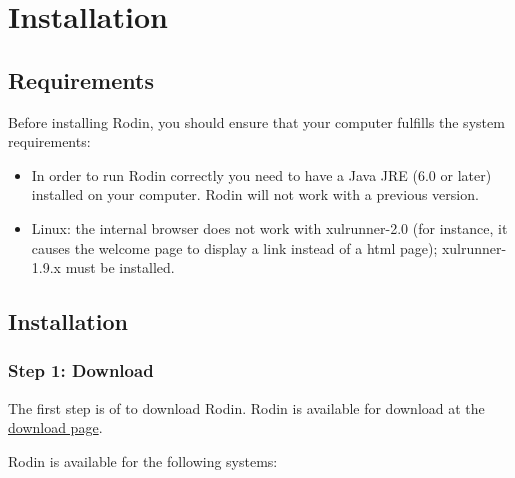 \section{Installation}
\label{tutorial_02}



\subsection{Requirements}

Before installing Rodin, you should ensure that your computer fulfills the system requirements:

\begin{itemize}
	\item In order to run Rodin correctly you need to have a Java JRE (6.0 or later) installed on your computer. Rodin will not work with a previous version.
	\item Linux: the internal browser does not work with xulrunner-2.0 (for instance, it causes the welcome page to display a link instead of a html page); xulrunner-1.9.x must be installed.
\end{itemize}

\subsection{Installation}

\subsubsection{Step 1: Download}

The first step is of to download Rodin. Rodin is available for download at the \href{http://sourceforge.net/projects/rodin-b-sharp/files/
Core_Rodin_Platform/}{download page}. 

Rodin is available for the following systems:

